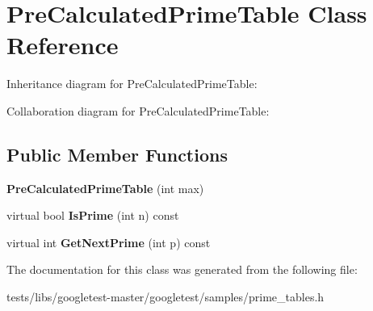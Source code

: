 \hypertarget{classPreCalculatedPrimeTable}{}\section{Pre\+Calculated\+Prime\+Table Class Reference}
\label{classPreCalculatedPrimeTable}


Inheritance diagram for Pre\+Calculated\+Prime\+Table\+:


Collaboration diagram for Pre\+Calculated\+Prime\+Table\+:
\subsection*{Public Member Functions}
\begin{DoxyCompactItemize}
\item 
\mbox{\label{classPreCalculatedPrimeTable_a6bb947504421e31da70d2c71576be350}} 
{\bfseries Pre\+Calculated\+Prime\+Table} (int max)
\item 
\mbox{\label{classPreCalculatedPrimeTable_a8a9ab7f99b09e5e987933c260e7304cf}} 
virtual bool {\bfseries Is\+Prime} (int n) const
\item 
\mbox{\label{classPreCalculatedPrimeTable_a0ff10b1fe13df7e56b8d7ed9f41d3998}} 
virtual int {\bfseries Get\+Next\+Prime} (int p) const
\end{DoxyCompactItemize}


The documentation for this class was generated from the following file\+:\begin{DoxyCompactItemize}
\item 
tests/libs/googletest-\/master/googletest/samples/prime\+\_\+tables.\+h\end{DoxyCompactItemize}
